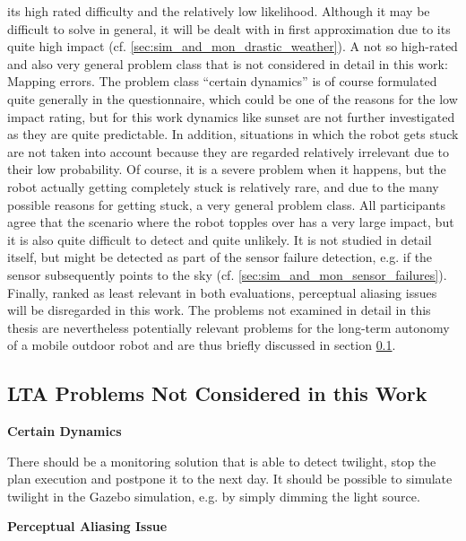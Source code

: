 \documentclass[english, master, utf8]{base/thesis_KBS}
\begin{document}
its high rated difficulty and the relatively low likelihood. Although it may be difficult to solve in general, it will be dealt with in first approximation due to its quite high
impact (cf. \ref{sec:sim_and_mon_drastic_weather}).\newline
A not so high-rated and also very general problem class that is not considered in detail in this work: Mapping errors. The problem class ``certain dynamics'' is of course formulated
quite generally in the questionnaire, which could be one of the reasons for the low impact rating, but for this work dynamics like sunset are not further investigated as they are
quite predictable. In addition, situations in which the robot gets stuck are not taken into account because they are regarded relatively irrelevant due to their low probability.
Of course, it is a severe problem when it happens, but the robot actually getting completely stuck is relatively rare, and due to the many possible reasons for getting stuck, 
a very general problem class. All participants agree that the scenario where the robot topples over has a very large impact, but it is also quite difficult to detect and quite
unlikely. It is not studied in detail itself, but might be detected as part of the sensor failure detection, e.g. if the sensor subsequently points to the sky (cf.
\ref{sec:sim_and_mon_sensor_failures}). Finally, ranked as least relevant in both evaluations, perceptual aliasing issues will be disregarded in this work. The problems not examined in
detail in this thesis are nevertheless potentially relevant problems for the long-term autonomy of a mobile outdoor robot and are thus briefly discussed in section 
\ref{sec:lta_problems_not_considered}.

\subsection{LTA Problems Not Considered in this Work}
\label{sec:lta_problems_not_considered}

\noindent
\textbf{Certain Dynamics}\newline

\noindent
There should be a monitoring solution that is able to detect twilight, stop the plan execution and postpone it to the next day.\newline
It should be possible to simulate twilight in the Gazebo simulation, e.g. by simply dimming the light source.\newline

\noindent
\textbf{Perceptual Aliasing Issue}\newline
\end{document}
